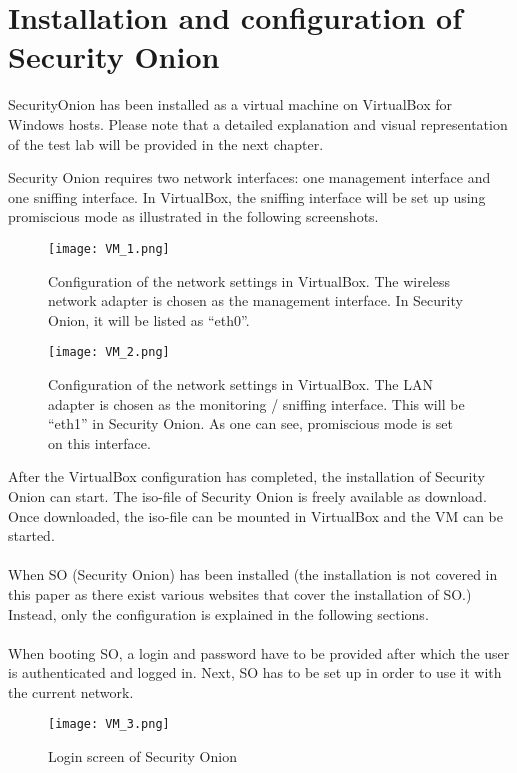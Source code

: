\section{Installation and configuration of Security Onion}

SecurityOnion has been installed as a virtual machine on VirtualBox for Windows hosts. Please note that a detailed explanation and visual representation of the test lab will be provided in the next chapter.

Security Onion requires two network interfaces: one management interface and one sniffing interface. In VirtualBox, the sniffing interface will be set up using promiscious mode as illustrated in the following screenshots.

\clearpage

\begin{figure}[h!]
    \centering
    \texttt{[image: VM\_1.png]}
    \caption{Configuration of the network settings in VirtualBox. The wireless network adapter is chosen as the management interface. In Security Onion, it will be listed as ``eth0''.}
\end{figure}

\begin{figure}[h!]
    \centering
    \texttt{[image: VM\_2.png]}
    \caption{Configuration of the network settings in VirtualBox. The LAN adapter is chosen as the monitoring / sniffing interface. This will be ``eth1'' in Security Onion. As one can see, promiscious mode is set on this interface.}
\end{figure}

After the VirtualBox configuration has completed, the installation of Security Onion can start. The iso-file of Security Onion is freely available as download. Once downloaded, the iso-file can be mounted in VirtualBox and the VM can be started. \\ \\
When SO (Security Onion) has been installed (the installation is not covered in this paper as there exist various websites that cover the installation of SO.) Instead, only the configuration is explained in the following sections. \\ \\
When booting SO, a login and password have to be provided after which the user is authenticated and logged in. Next, SO has to be set up in order to use it with the current network.

\begin{figure}[h]
    \centering
    \texttt{[image: VM\_3.png]}
    \caption{Login screen of Security Onion}
\end{figure}

